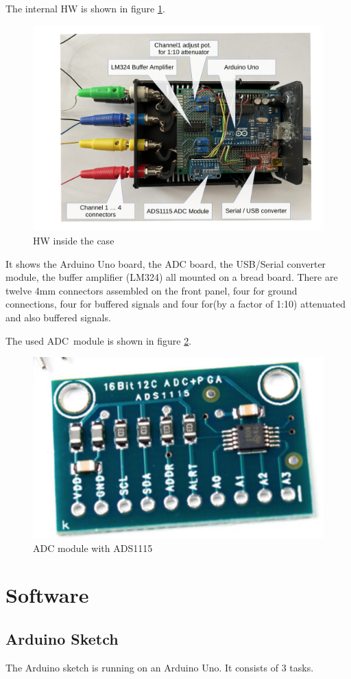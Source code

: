 \documentclass[11pt, oneside]{scrartcl}   	%
\begin{document}
The internal HW is shown in figure \ref{fig:HWInternals}.
\begin{figure}[htbp]
	\centering
	\includegraphics[width=0.85\linewidth]{Figures/HWInternals1.pdf}
	\caption{HW inside the case}
	\label{fig:HWInternals}
\end{figure}
It shows the Arduino Uno board, the ADC board, the USB/Serial converter module, the buffer amplifier (LM324) all mounted on a bread board.
There are twelve 4mm connectors assembled on the front panel, four for ground connections, four for buffered signals and four for(by a factor of 1:10) attenuated and also buffered signals.

The used ADC module is shown in figure \ref{fig:ADCModule}.
\begin{figure}[htbp]
	\centering
	\includegraphics[width=0.5\linewidth]{Figures/ADS1115ADCBoard.png}
	\caption{ADC module with ADS1115}
	\label{fig:ADCModule}
\end{figure}



\newpage
\section{Software}
\subsection{Arduino Sketch}
The Arduino sketch is running on an Arduino Uno. It consists of 3 tasks.
\end{document}
